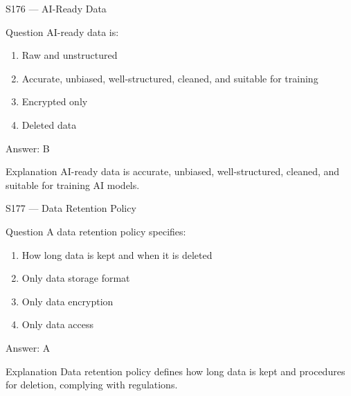 \documentclass[aspectratio=169,8pt]{beamer}
\begin{document}
	\begin{frame}{S176 --- AI-Ready Data}
		\begin{block}{Question}
			AI-ready data is:
			\begin{enumerate}
				\item Raw and unstructured
				\item Accurate, unbiased, well-structured, cleaned, and suitable for training
				\item Encrypted only
				\item Deleted data
			\end{enumerate}
		\end{block}
		\begin{exampleblock}{Answer: B}\end{exampleblock}
		\begin{block}{Explanation}
			AI-ready data is accurate, unbiased, well-structured, cleaned, and suitable for training AI models.
		\end{block}
	\end{frame}
	
	\begin{frame}{S177 --- Data Retention Policy}
		\begin{block}{Question}
			A data retention policy specifies:
			\begin{enumerate}
				\item How long data is kept and when it is deleted
				\item Only data storage format
				\item Only data encryption
				\item Only data access
			\end{enumerate}
		\end{block}
		\begin{exampleblock}{Answer: A}\end{exampleblock}
		\begin{block}{Explanation}
			Data retention policy defines how long data is kept and procedures for deletion, complying with regulations.
		\end{block}
	\end{frame}
	
\end{document}

